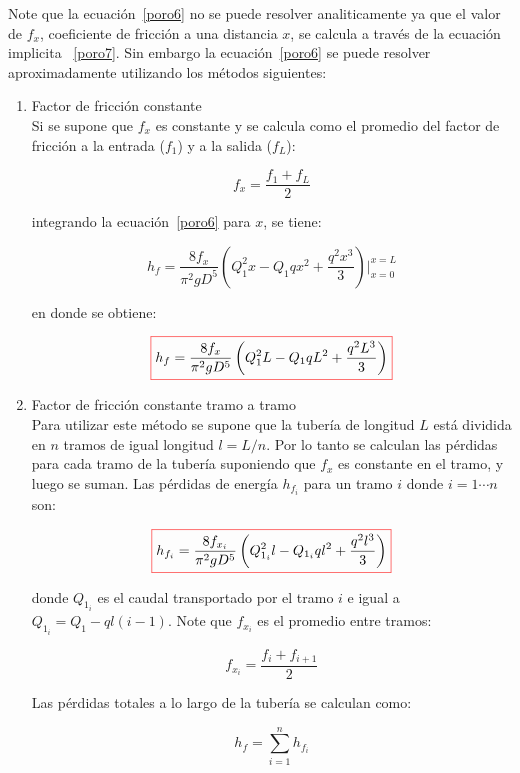 \documentclass[11pt, oneside]{article}
\begin{document}
\begin{itemize}
Note que la ecuaci\'on~\ref{poro6} no se puede resolver analiticamente ya que el valor de $f_x$, coeficiente de fricci\'on a una distancia $x$, se calcula a trav\'es de la ecuaci\'on implicita ~\ref{poro7}. Sin embargo la ecuaci\'on~\ref{poro6} se puede resolver aproximadamente utilizando los m\'etodos siguientes:

\begin{enumerate}
\item Factor de fricci\'on constante\\
Si se supone que $f_x$ es constante y se calcula como el promedio del factor de fricci\'on a la entrada ($f_1$) y a la salida ($f_L$):

\begin{equation}
f_x = \frac{f_1 + f_L}{2}
\label{poro8}
\end{equation}

integrando la ecuaci\'on~\ref{poro6} para $x$, se tiene:

\begin{equation}
 h_f = \frac{8 f_x}{\pi^2 g D^5} \left( Q_1^2 x - Q_1 q x^2  + \frac{q^2 x^3 }{3} \right) \Bigg|_{x=0}^{x=L}
\label{poro9}
\end{equation}

en donde se obtiene:

\begin{equation}
\color{red}\boxed{\color{black} h_f = \frac{8 f_x}{\pi^2 g D^5} \left( Q_1^2 L - Q_1 q L^2  + \frac{q^2 L^3 }{3} \right) }
\label{poro10}
\end{equation}

\item Factor de fricci\'on constante tramo a tramo\\
Para utilizar este m\'etodo se supone que la tuber\'ia de longitud $L$ est\'a dividida en $n$ tramos de igual longitud $l=L/n$. Por lo tanto se calculan las p\'erdidas para cada tramo de la tuber\'ia suponiendo que $f_x$ es constante en el tramo, y luego se suman. Las p\'erdidas de energ\'ia $h_{f_i}$ para un tramo $i$ donde $i=1 \cdots n$ son:

\begin{equation}
\color{red}\boxed{\color{black} h_{f_i} = \frac{8 f_{x_i}}{\pi^2 g D^5} \left( Q_{1_i}^2 l - Q_{1_i} q l^2  + \frac{q^2 l^3 }{3} \right) }
\label{poro11}
\end{equation}

donde $Q_{1_i}$ es el caudal transportado por el tramo $i$ e igual a $Q_{1_i} = Q_1 - ql(i-1)$. Note que $f_{x_i}$ es el promedio entre tramos:

\begin{equation}
f_{x_i} = \frac{f_i + f_{i+1}}{2}
\label{poro12}
\end{equation}

Las p\'erdidas totales a lo largo de la tuber\'ia se calculan como:

\begin{equation}
h_f = \sum_{i=1}^{n} h_{f_i}
\label{poro13}
\end{equation}

\end{enumerate}
\end{itemize}
\end{document}
